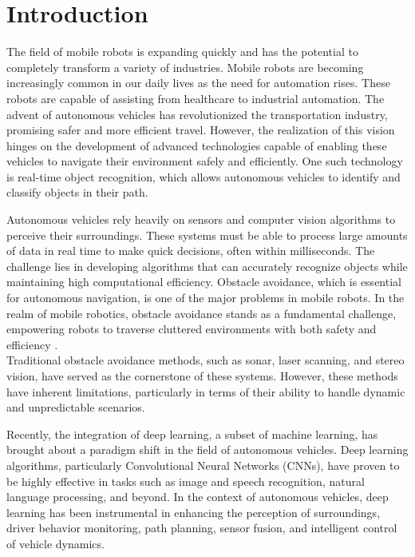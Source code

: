 \section{Introduction}

The field of mobile robots is expanding quickly and has the potential to completely transform a variety of industries. Mobile robots are becoming increasingly common in our daily lives as the need for automation rises. These robots are capable of assisting from healthcare to industrial automation. The advent of autonomous vehicles has revolutionized the transportation industry, promising safer and more efficient travel. However, the realization of this vision hinges on the development of advanced technologies capable of enabling these vehicles to navigate their environment safely and efficiently. One such technology is real-time object recognition, which allows autonomous vehicles to identify and classify objects in their path. 

Autonomous vehicles rely heavily on sensors and computer vision algorithms to perceive their surroundings. These systems must be able to process large amounts of data in real time to make quick decisions, often within milliseconds. The challenge lies in developing algorithms that can accurately recognize objects while maintaining high computational efficiency.  Obstacle avoidance, which is essential for autonomous navigation, is one of the major problems in mobile robots. In the realm of mobile robotics, obstacle avoidance stands as a fundamental challenge, empowering robots to traverse cluttered environments with both safety and efficiency \cite{wenzel2021vision}.\\
 Traditional obstacle avoidance methods, such as sonar, laser scanning, and stereo vision, have served as the cornerstone of these systems. However, these methods have inherent limitations, particularly in terms of their ability to handle dynamic and unpredictable scenarios.

Recently, the integration of deep learning, a subset of machine learning, has brought about a paradigm shift in the field of autonomous vehicles. Deep learning algorithms, particularly Convolutional Neural Networks (CNNs), have proven to be highly effective in tasks such as image and speech recognition, natural language processing, and beyond. In the context of autonomous vehicles, deep learning has been instrumental in enhancing the perception of surroundings, driver behavior monitoring, path planning, sensor fusion, and intelligent control of vehicle dynamics.

